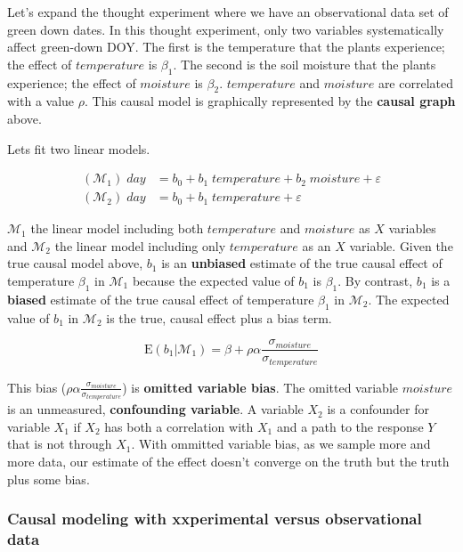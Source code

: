 \documentclass[]{book}
\begin{document}
Let's expand the thought experiment where we have an observational data set of green down dates. In this thought experiment, only two variables systematically affect green-down DOY. The first is the temperature that the plants experience; the effect of \(temperature\) is \(\beta_1\). The second is the soil moisture that the plants experience; the effect of \(moisture\) is \(\beta_2\). \(temperature\) and \(moisture\) are correlated with a value \(\rho\). This causal model is graphically represented by the \textbf{causal graph} above.

Lets fit two linear models.

\begin{align}
(\mathcal{M}_1)\; day &= b_0 + b_1 \; temperature + b_2 \; moisture + \varepsilon\\
(\mathcal{M}_2)\; day &= b_0 + b_1 \; temperature + \varepsilon
\end{align}

\(\mathcal{M}_1\) the linear model including both \(temperature\) and \(moisture\) as \(X\) variables and \(\mathcal{M}_2\) the linear model including only \(temperature\) as an \(X\) variable. Given the true causal model above, \(b_1\) is an \textbf{unbiased} estimate of the true causal effect of temperature \(\beta_1\) in \(\mathcal{M}_1\) because the expected value of \(b_1\) is \(\beta_1\). By contrast, \(b_1\) is a \textbf{biased} estimate of the true causal effect of temperature \(\beta_1\) in \(\mathcal{M}_2\). The expected value of \(b_1\) in \(\mathcal{M}_2\) is the true, causal effect plus a bias term.

\begin{equation}
\mathrm{E}(b_1|\mathcal{M}_1) = \beta + \rho \alpha \frac{\sigma_{moisture}}{\sigma_{temperature}}
\end{equation}

This bias (\(\rho \alpha \frac{\sigma_{moisture}}{\sigma_{temperature}}\)) is \textbf{omitted variable bias}. The omitted variable \(moisture\) is an unmeasured, \textbf{confounding variable}. A variable \(X_2\) is a confounder for variable \(X_1\) if \(X_2\) has both a correlation with \(X_1\) and a path to the response \(Y\) that is not through \(X_1\). With ommitted variable bias, as we sample more and more data, our estimate of the effect doesn't converge on the truth but the truth plus some bias.

\hypertarget{causal-modeling-with-xxperimental-versus-observational-data}{%
\subsubsection{Causal modeling with xxperimental versus observational data}\label{causal-modeling-with-xxperimental-versus-observational-data}}
\end{document}
